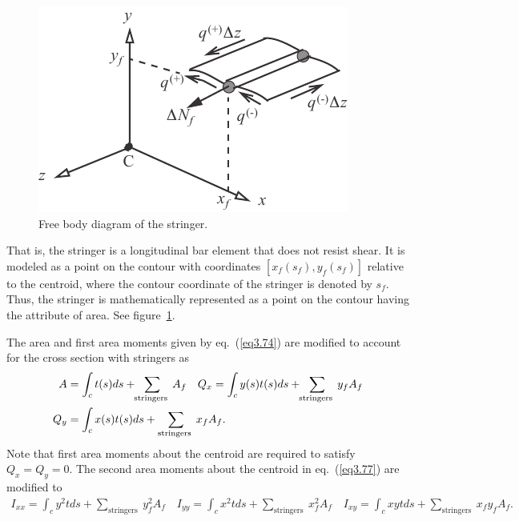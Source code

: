 \documentclass{AeroStructure-ERJohnson}
\begin{document}
\begin{figure}
\vspace*{-12pt}
\includegraphics{Figure_3-20.pdf}
\caption{Free body diagram of the stringer.\label{fig3.20}}
\end{figure}

\noindent That is, the stringer is a longitudinal bar element that does not resist shear. It is modeled as a point on the contour with coordinates $\left[x_{f}\left(s_{f}\right), y_{f}\left(s_{f}\right)\right]$ relative to the centroid, where the contour coordinate of the stringer is denoted by $s_{f}$. Thus, the stringer is mathematically represented as a point on the contour having the attribute of area. See figure~\ref{fig3.20}.

The area and first area moments given by eq.~(\ref{eq3.74}) are modified to account for the cross section with stringers as
\begin{align}
A&=\int_{c} t(s) d s+\hspace*{-3pt}\sum_{\text {stringers }} A_{f} \quad Q_{x}=\int_{c} y(s) t(s) d s+\hspace*{-3pt}\sum_{\text {stringers }} y_{f} A_{f} \nonumber\\
Q_{y} &=\int_{c} x(s) t(s) d s+\sum_{\text {stringers }} x_{f} A_{f}.\label{eq3.133}
\end{align}
Note that first area moments about the centroid are required to satisfy $Q_{x}=Q_{y}=0$. The second area moments about the centroid in eq.~(\ref{eq3.77}) are modified to
\begin{align}
I_{x x}=\int_{c} y^{2} t d s+\sum_{\text {stringers }} y_{f}^{2} A_{f} \quad I_{y y}=\int_{c} x^{2} t d s+\sum_{\text {stringers }} x_{f}^{2} A_{f} \quad
I_{x y}=\int_{c} x y t d s+\sum_{\text {stringers }} x_{f} y_{f} A_{f}. \label{eq3.134}
\end{align}
\end{document}
